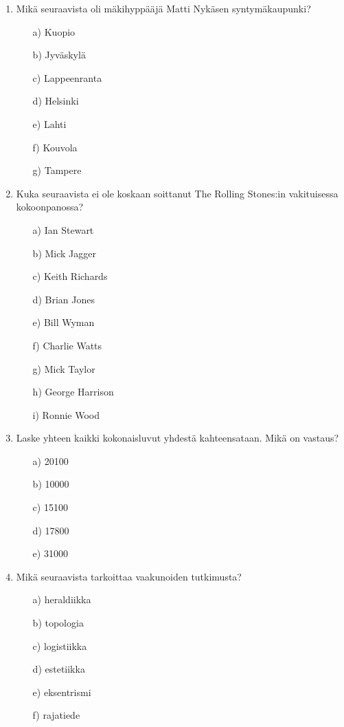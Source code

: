 \documentclass[a4paper,12pt,twoside]{article}
\begin{document}
\begin{enumerate}
\begin{itemize}
  \end{itemize}
\item{Mikä seuraavista oli mäkihyppääjä Matti Nykäsen syntymäkaupunki?}
  \begin{itemize}
  \item[a)]{Kuopio}
  \item[b)]{Jyväskylä}
  \item[c)]{Lappeenranta}
  \item[d)]{Helsinki}
  \item[e)]{Lahti}
  \item[f)]{Kouvola}
  \item[g)]{Tampere}
  \end{itemize}
  \newpage
\item{Kuka seuraavista ei ole koskaan soittanut The Rolling Stones:in vakituisessa kokoonpanossa?}
  \begin{itemize}
  \item[a)]{Ian Stewart}
  \item[b)]{Mick Jagger}
  \item[c)]{Keith Richards}
  \item[d)]{Brian Jones}
  \item[e)]{Bill Wyman}
  \item[f)]{Charlie Watts}
  \item[g)]{Mick Taylor}
  \item[h)]{George Harrison}
  \item[i)]{Ronnie Wood}
  \end{itemize}
\item{Laske yhteen kaikki kokonaisluvut yhdestä kahteensataan. Mikä on vastaus?}
  \begin{itemize}
  \item[a)]{20100}
  \item[b)]{10000}
  \item[c)]{15100}
  \item[d)]{17800}
  \item[e)]{31000}
  \end{itemize}
\item{Mikä seuraavista tarkoittaa vaakunoiden tutkimusta?}
  \begin{itemize}
  \item[a)]{heraldiikka}
  \item[b)]{topologia}
  \item[c)]{logistiikka}
  \item[d)]{estetiikka}
  \item[e)]{eksentrismi}
  \item[f)]{rajatiede}
  \end{itemize}
\end{enumerate}
\end{document}
